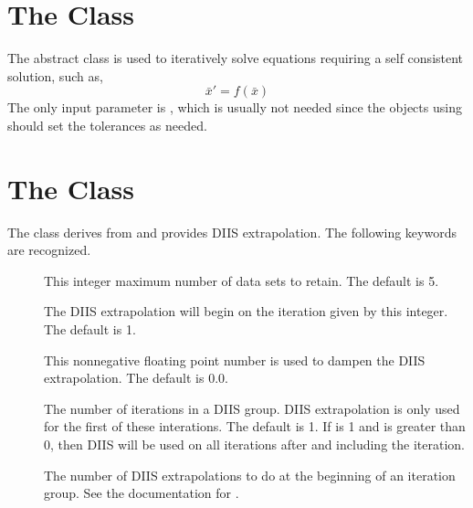 
\section{The  Class}
\label{SelfConsistentExtrapolation}

The  abstract class is used
to iteratively solve equations requiring a self consistent solution,
such as,
\[ \bar{x}' = f(\bar{x}) \]
The only input parameter is , which is usually not needed
since the objects using  should set the
tolerances as needed.

\section{The  Class}
\label{DIIS}

The  class derives from 
and provides DIIS extrapolation.  The following keywords are recognized.

\begin{description}
  \item[] This integer maximum number of data sets to retain.
     The default is 5.

  \item[] The DIIS extrapolation will begin on the iteration
     given by this integer.  The default is 1.

  \item[] This nonnegative floating point number is
     used to dampen the DIIS extrapolation.  The default is 0.0.

  \item[] The number of iterations in a DIIS group.  DIIS
     extrapolation is only used for the first  of these
     interations.  The default is 1.  If  is 1 and
      is greater than 0, then DIIS will be used on all
     iterations after and including the  iteration.

  \item[] The number of DIIS extrapolations to do at the
     beginning of an iteration group.  See the documentation for
     .

\end{description}
